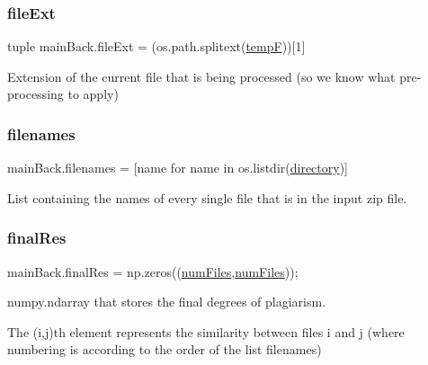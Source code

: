 \subsubsection{\texorpdfstring{file\+Ext}{fileExt}}
{\footnotesize\ttfamily tuple main\+Back.\+file\+Ext = (os.\+path.\+splitext(\hyperlink{namespacemain_back_afe5cb30123edd8f4ce029bd8dc01a015}{tempF}))\mbox{[}1\mbox{]}}



Extension of the current file that is being processed (so we know what pre-\/processing to apply) 

\mbox{\label{namespacemain_back_ac066274638425ed709610bda61383714}} 
\subsubsection{\texorpdfstring{filenames}{filenames}}
{\footnotesize\ttfamily main\+Back.\+filenames = \mbox{[}name for name in os.\+listdir(\hyperlink{namespacemain_back_a1c89e94124b1c6fedb3a2c9fe2d299c4}{directory})\mbox{]}}



List containing the names of every single file that is in the input zip file. 

\mbox{\label{namespacemain_back_a864d25dd2821f3c46a914ace51562000}} 
\subsubsection{\texorpdfstring{final\+Res}{finalRes}}
{\footnotesize\ttfamily main\+Back.\+final\+Res = np.\+zeros((\hyperlink{namespacemain_back_a5a0d1ff5b5d2f3a4bec2f88ef04385b3}{num\+Files},\hyperlink{namespacemain_back_a5a0d1ff5b5d2f3a4bec2f88ef04385b3}{num\+Files}));}



numpy.\+ndarray that stores the final degrees of plagiarism. 

The (i,j)th element represents the similarity between files i and j (where numbering is according to the order of the list filenames) \mbox{\label{namespacemain_back_a2aabdc9357aa71da0c092014593e643e}} 
